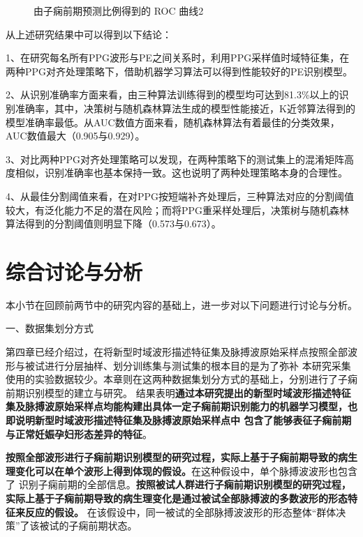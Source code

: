 \vspace{-1.0cm} 
\begin{figure}[htbp]
      \centering
      \quad
      \caption{\label{fig:model_roc2}由子痫前期预测比例得到的 ROC 曲线2}
\end{figure}
\vspace{1.5cm} 

从上述研究结果中可以得到以下结论：

1、在研究每名所有PPG波形与PE之间关系时，利用PPG采样值时域特征集，在两种PPG对齐处理策略下，借助机器学习算法可以得到性能较好的PE识别模型。

2、从识别准确率方面来看，由三种算法训练得到的模型均可达到81.3\%以上的识别准确率，其中，决策树与随机森林算法生成的模型性能接近，K近邻算法得到的模型准确率最低。从AUC数值方面来看，随机森林算法有着最佳的分类效果，AUC数值最大（0.905与0.929）。

3、对比两种PPG对齐处理策略可以发现，在两种策略下的测试集上的混淆矩阵高度相似，识别准确率也基本保持一致。这也说明了两种处理策略本身的合理性。

4、从最佳分割阈值来看，在对PPG按短端补齐处理后，三种算法对应的分割阈值较大，有泛化能力不足的潜在风险；而将PPG重采样处理后，决策树与随机森林算法得到的分割阈值则明显下降（0.573与0.673）。

\section{综合讨论与分析}
本小节在回顾前两节中的研究内容的基础上，进一步对以下问题进行讨论与分析。

一、数据集划分方式

第四章已经介绍过，在将新型时域波形描述特征集及脉搏波原始采样点按照全部波形与被试进行分层抽样、划分训练集与测试集的根本目的是为了弥补
本研究采集使用的实验数据较少。本章则在这两种数据集划分方式的基础上，分别进行了子痫前期识别模型的建立与研究。
结果表明\textbf{通过本研究提出的新型时域波形描述特征集及脉搏波原始采样点均能构建出具体一定子痫前期识别能力的机器学习模型，也即说明新型时域波形描述特征集及脉搏波原始采样点中
包含了能够表征子痫前期与正常妊娠孕妇形态差异的特征}。

\textbf{按照全部波形进行子痫前期识别模型的研究过程，实际上基于子痫前期导致的病生理变化可以在单个波形上得到体现的假设。}在这种假设中，单个脉搏波波形也包含了
识别子痫前期的全部信息。\textbf{按照被试人群进行子痫前期识别模型的研究过程，实际上基于子痫前期导致的病生理变化是通过被试全部脉搏波的多数波形的形态特征来反应的假设。}
在该假设中，同一被试的全部脉搏波波形的形态整体“群体决策”了该被试的子痫前期状态。


